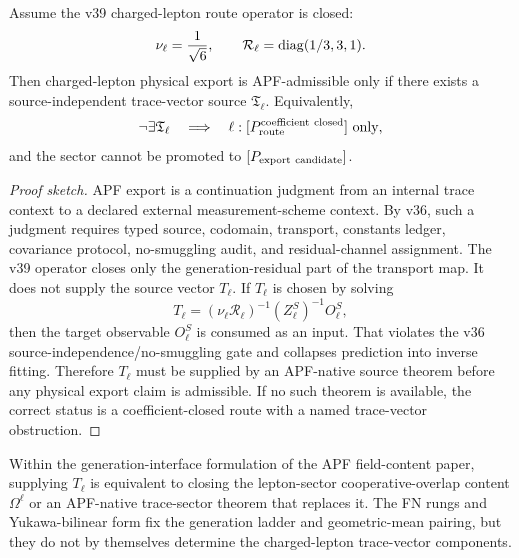 \begin{theorem}\label{thm:charged-lepton-trace-vector-source-gate-v40}
Assume the v39 charged-lepton route operator is closed:
\[
  \nu_\ell={1\over\sqrt6},\qquad
  \mathcal R_\ell=\operatorname{diag}(1/3,3,1).
\]
Then charged-lepton physical export is APF-admissible only if there exists a
source-independent trace-vector source \(\mathfrak T_\ell\).  Equivalently,
\[
  \neg\exists\mathfrak T_\ell
  \quad\Longrightarrow\quad
  \ell:[P_{\rm route}^{\rm coefficient\ closed}]\ \text{only},
\]
and the sector cannot be promoted to \([P_{\rm export\ candidate}]\).
\end{theorem}

\begin{proof}[Proof sketch]
APF export is a continuation judgment from an internal trace context to a declared
external measurement-scheme context.  By v36, such a judgment requires typed source,
codomain, transport, constants ledger, covariance protocol, no-smuggling audit, and
residual-channel assignment.  The v39 operator closes only the generation-residual part
of the transport map.  It does not supply the source vector \(T_\ell\).  If \(T_\ell\) is
chosen by solving
\[
   T_\ell=(\nu_\ell\mathcal R_\ell)^{-1}(Z_\ell^S)^{-1}O_\ell^S,
\]
then the target observable \(O_\ell^S\) is consumed as an input.  That violates the v36
source-independence/no-smuggling gate and collapses prediction into inverse fitting.
Therefore \(T_\ell\) must be supplied by an APF-native source theorem before any physical
export claim is admissible.  If no such theorem is available, the correct status is a
coefficient-closed route with a named trace-vector obstruction.
\end{proof}

\begin{proposition}\label{prop:trace-vector-omega-equivalence-v40}
Within the generation-interface formulation of the APF field-content paper, supplying
\(T_\ell\) is equivalent to closing the lepton-sector cooperative-overlap content
\(\Omega^\ell\) or an APF-native trace-sector theorem that replaces it.  The FN rungs and
Yukawa-bilinear form fix the generation ladder and geometric-mean pairing, but they do not
by themselves determine the charged-lepton trace-vector components.
\end{proposition}

